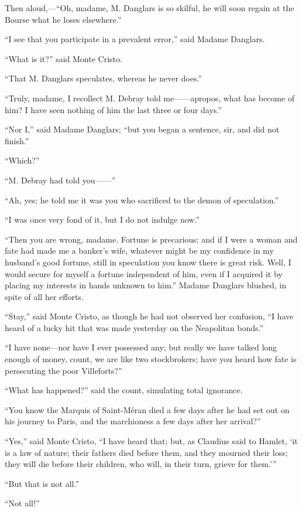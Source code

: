 Then aloud,—“Oh, madame, M. Danglars is so skilful, he will soon regain
at the Bourse what he loses elsewhere.”

“I see that you participate in a prevalent error,” said Madame
Danglars.

“What is it?” said Monte Cristo.

“That M. Danglars speculates, whereas he never does.”

“Truly, madame, I recollect M. Debray told me——apropos, what has become
of him? I have seen nothing of him the last three or four days.”

“Nor I,” said Madame Danglars; “but you began a sentence, sir, and did
not finish.”

“Which?”

“M. Debray had told you——”

“Ah, yes; he told me it was you who sacrificed to the demon of
speculation.”

“I was once very fond of it, but I do not indulge now.”

“Then you are wrong, madame. Fortune is precarious; and if I were a
woman and fate had made me a banker’s wife, whatever might be my
confidence in my husband’s good fortune, still in speculation you know
there is great risk. Well, I would secure for myself a fortune
independent of him, even if I acquired it by placing my interests in
hands unknown to him.” Madame Danglars blushed, in spite of all her
efforts.

“Stay,” said Monte Cristo, as though he had not observed her confusion,
“I have heard of a lucky hit that was made yesterday on the Neapolitan
bonds.”

“I have none—nor have I ever possessed any; but really we have talked
long enough of money, count, we are like two stockbrokers; have you
heard how fate is persecuting the poor Villeforts?”

“What has happened?” said the count, simulating total ignorance.

“You know the Marquis of Saint-Méran died a few days after he had set
out on his journey to Paris, and the marchioness a few days after her
arrival?”

“Yes,” said Monte Cristo, “I have heard that; but, as Claudius said to
Hamlet, ‘it is a law of nature; their fathers died before them, and
they mourned their loss; they will die before their children, who will,
in their turn, grieve for them.’”

“But that is not all.”

“Not all!”

